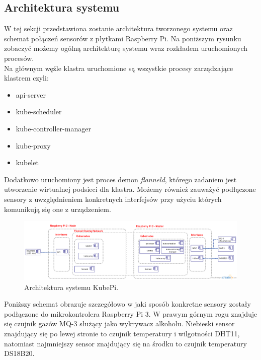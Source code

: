 \documentclass[12pt]{report}
\let\Oldsubsection\subsection
\renewcommand{\subsection}{\FloatBarrier\Oldsubsection}
\begin{document}
{\subsection{Architektura systemu}
W tej sekcji przedstawiona zostanie architektura tworzonego systemu oraz schemat połączeń sensorów z płytkami Raspberry Pi. Na poniższym rysunku zobaczyć możemy ogólną architekturę systemu wraz rozkładem uruchomionych procesów. \\
Na głównym węźle klastra uruchomione są wszystkie procesy zarządzające klastrem czyli:
\begin{itemize}
\item{api-server}
\item{kube-scheduler}
\item{kube-controller-manager}
\item{kube-proxy}
\item{kubelet}
\end{itemize}

Dodatkowo uruchomiony jest proces demon \textit{flanneld}, którego zadaniem jest utworzenie wirtualnej podsieci dla klastra. Możemy również zauważyć podłączone sensory z uwzględnieniem konkretnych interfejsów przy użyciu których komunikują się one z urządzeniem.


\begin{figure}[h]
	\centering
	\includegraphics[height=0.41\textwidth, angle=90]{images/KubePi-Architecture.png}
	\caption{Architektura systemu KubePi.}
\end{figure}
\FloatBarrier	

Poniższy schemat obrazuje szczegółowo w jaki sposób konkretne sensory zostały podłączone do mikrokontrolera Raspberry Pi 3. W prawym górnym rogu znajduje się czujnik gazów MQ-3 służący jako wykrywacz alkoholu. Niebieski sensor znajdujący się po lewej stronie to czujnik temperatury i wilgotności DHT11, natomiast najmniejszy sensor znajdujący się na środku to czujnik temperatury DS18B20.

}
\end{document}
